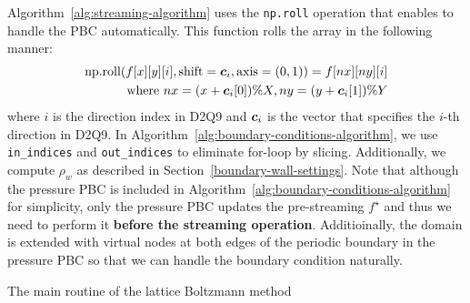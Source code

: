 Algorithm~\ref{alg:streaming-algorithm} uses
the {\tt np.roll} operation that enables
to handle the PBC automatically.
This function rolls the array in the following manner:
\begin{equation}
\begin{aligned}
  \text{np.roll}(f[x][y][i], \text{shift}=\boldsymbol{c}_i, \text{axis}=(0, 1)) =
  f[nx][ny][i] \\
  \text{where }
  nx = (x + \boldsymbol{c}_i[0]) \% X,
  ny = (y + \boldsymbol{c}_i[1]) \% Y
\end{aligned}
\end{equation}
where $i$ is the direction index in D2Q9 and $\boldsymbol{c}_i$ is the vector
that specifies the $i$-th direction in D2Q9.
In Algorithm~\ref{alg:boundary-conditions-algorithm},
we use {\tt in\_indices} and {\tt out\_indices}
to eliminate for-loop by slicing.
Additionally, we compute $\rho_w$ as described in Section~\ref{boundary-wall-settings}.
Note that 
although the pressure PBC is included in Algorithm~\ref{alg:boundary-conditions-algorithm}
for simplicity,
only the pressure PBC updates the pre-streaming $f^\star$
and thus we need to perform it {\bf before the streaming operation}.
Additioinally, the domain is extended with virtual nodes 
at both edges of the periodic boundary in the pressure PBC
so that we can handle the boundary condition naturally. 


\begin{algorithm}[tb]
  \caption{The main routine of the lattice Boltzmann method}
  \label{alg:lattice-boltzmann-method-algorithm}
  \begin{algorithmic}[1]
     
    \State{$\rho(\xv, 0) = \rho_0, \uv(\xv, 0) = \uv_0$ for all $\xv \in [0, X) \times [0, Y)$}
    \EndFor
    \EndFunction
  \end{algorithmic}
\end{algorithm}

